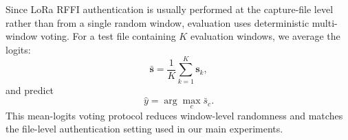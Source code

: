 Since LoRa RFFI authentication is usually performed at the capture-file level rather than from a single random window, evaluation uses deterministic multi-window voting. For a test file containing $K$ evaluation windows, we average the logits:
\begin{equation}
    \bar{\mathbf{s}}
    =
    \frac{1}{K}
    \sum_{k=1}^{K}
    \mathbf{s}_{k},
\end{equation}
and predict
\begin{equation}
    \hat{y}
    =
    \arg\max_{c}
    \bar{s}_{c}.
\end{equation}
This mean-logits voting protocol reduces window-level randomness and matches the file-level authentication setting used in our main experiments.
